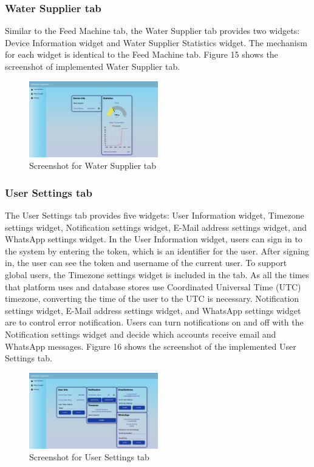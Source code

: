 \documentclass[conference]{IEEEtran}
\begin{document}
\subsubsection{Water Supplier tab}
Similar to the Feed Machine tab, the Water Supplier tab provides two widgets: Device Information widget and Water Supplier Statistics widget. The mechanism for each widget is identical to the Feed Machine tab. Figure 15 shows the screenshot of implemented Water Supplier tab.

\begin{figure}[htbp]
\centerline{\includegraphics[width=0.5\textwidth]{./images/water_supplier_ui.png}}
\caption{Screenshot for Water Supplier tab}
\label{fig}
\end{figure}

\subsubsection{User Settings tab}
The User Settings tab provides five widgets: User Information widget, Timezone settings widget, Notification settings widget, E-Mail address settings widget, and WhatsApp settings widget. 
In the User Information widget, users can sign in to the system by entering the token, which is an identifier for the user. After signing in, the user can see the token and username of the current user.
To support global users, the Timezone settings widget is included in the tab. As all the times that platform uses and database stores use Coordinated Universal Time (UTC) timezone, converting the time of the user to the UTC is necessary.
Notification settings widget, E-Mail address settings widget, and WhatsApp settings widget are to control error notification. Users can turn notifications on and off with the Notification settings widget and decide which accounts receive email and WhatsApp messages. Figure 16 shows the screenshot of the implemented User Settings tab.

\begin{figure}[htbp]
\centerline{\includegraphics[width=0.5\textwidth]{./images/user_settings_ui.png}}
\caption{Screenshot for User Settings tab}
\label{fig}
\end{figure}
\end{document}
